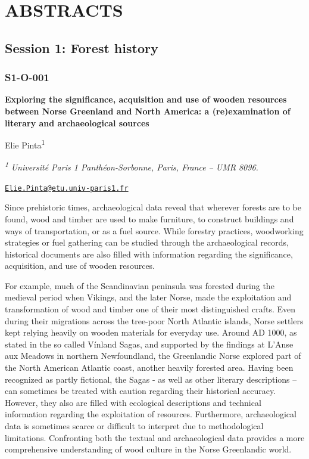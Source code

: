 \documentclass[
]{book}
\begin{document}
\hypertarget{part-abstracts}{%
\part*{ABSTRACTS}\label{part-abstracts}}

\hypertarget{session-1-forest-history}{%
\chapter*{Session 1: Forest history}\label{session-1-forest-history}}

\hypertarget{s1-o-001}{%
\section*{S1-O-001}\label{s1-o-001}}

\textbf{Exploring the significance, acquisition and use of wooden resources between Norse Greenland and North America: a (re)examination of literary and archaeological sources}

Elie Pinta\textsuperscript{1}

\textsuperscript{\emph{1}} \emph{Université Paris 1 Panthéon-Sorbonne, Paris, France -- UMR 8096.}

\href{mailto:Elie.Pinta@etu.univ-paris1.fr}{\nolinkurl{Elie.Pinta@etu.univ-paris1.fr}}

Since prehistoric times, archaeological data reveal that wherever forests are to be found, wood and timber are used to make furniture, to construct buildings and ways of transportation, or as a fuel source. While forestry practices, woodworking strategies or fuel gathering can be studied through the archaeological records, historical documents are also filled with information regarding the significance, acquisition, and use of wooden resources.

For example, much of the Scandinavian peninsula was forested during the medieval period when Vikings, and the later Norse, made the exploitation and transformation of wood and timber one of their most distinguished crafts. Even during their migrations across the tree-poor North Atlantic islands, Norse settlers kept relying heavily on wooden materials for everyday use. Around AD 1000, as stated in the so called Vínland Sagas, and supported by the findings at L'Anse aux Meadows in northern Newfoundland, the Greenlandic Norse explored part of the North American Atlantic coast, another heavily forested area. Having been recognized as partly fictional, the Sagas - as well as other literary descriptions -- can sometimes be treated with caution regarding their historical accuracy. However, they also are filled with ecological descriptions and technical information regarding the exploitation of resources. Furthermore, archaeological data is sometimes scarce or difficult to interpret due to methodological limitations. Confronting both the textual and archaeological data provides a more comprehensive understanding of wood culture in the Norse Greenlandic world.
\end{document}
